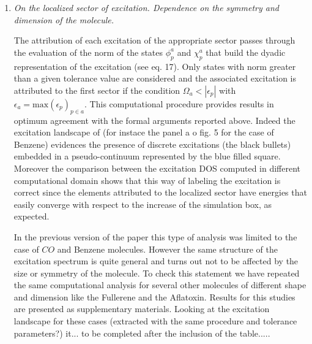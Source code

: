 \documentclass[11pt,a4paper]{article}
\begin{document}
\begin{enumerate}

 \item \emph{On the localized sector of excitation. Dependence on the symmetry and dimension of the molecule.}

 The attribution of each excitation of the appropriate sector passes through the evaluation of the norm of the states $\phi_p^a$ and $\chi_p^a$ that build
 the dyadic representation of the excitation (see eq. 17). Only states with norm greater than a given tolerance value are considered and the associated
 excitation is attributed to the first sector if the condition $\Omega_a < |\epsilon_p|$ with $\epsilon_a = \mathrm{max}\left(\epsilon_p\right)_{p\in a}$.
 This computational procedure provides results in optimum agreement with the formal arguments reported above. Indeed the excitation landscape of
 (for instace the panel a o fig. 5 for the case of Benzene) evidences the presence of discrete excitations (the black bullets) embedded in a pseudo-continuum
 represented by the blue filled square. Moreover the comparison between the excitation DOS computed in different computational domain shows that this way of labeling the excitation is correct since the elements attributed to the localized sector have energies that easily converge with respect to the increase of the simulation box, as expected.

 In the previous version of the paper this type of analysis was limited to the case of $CO$ and Benzene molecules. However the same structure of the excitation spectrum is quite general and turns out not to be affected by the size or symmetry of the molecule. To check this statement we have repeated
 the same computational analysis for several other molecules of different shape and dimension like the Fullerene and the Aflatoxin. Results for this studies
 are presented as supplementary materials. Looking at the excitation landscape for these cases (extracted with the same procedure and tolerance parameters?) it...
 to be completed after the inclusion of the table.....


\end{enumerate}
\end{document}
